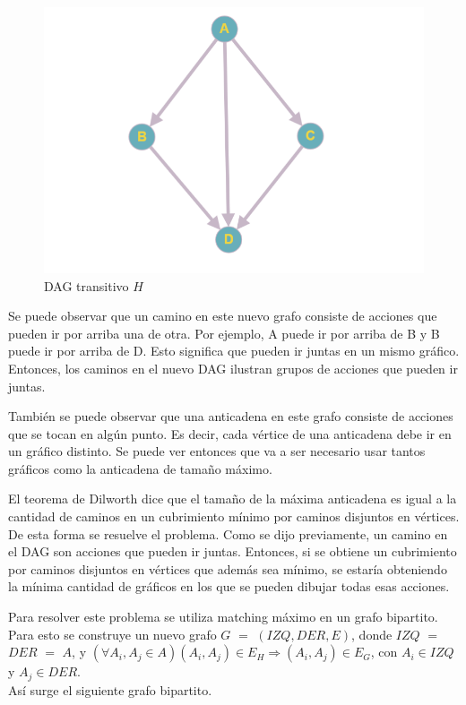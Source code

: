 \begin{figure}[H]
\centering
\includegraphics[width=15cm]{Imagenes/Ej2a.png}
\caption{DAG transitivo $H$}
\end{figure}

Se puede observar que un camino en este nuevo grafo consiste de acciones que pueden ir por arriba una de otra. Por ejemplo, A puede ir por arriba de B y B puede ir por arriba de D. Esto significa que pueden ir juntas en un mismo gráfico. Entonces, los caminos en el nuevo DAG ilustran grupos de acciones que pueden ir juntas.

También se puede observar que una anticadena en este grafo consiste de acciones que se tocan en algún punto. Es decir, cada vértice de una anticadena debe ir en un gráfico distinto. Se puede ver entonces que va a ser necesario usar tantos gráficos como la anticadena de tamaño máximo.

El teorema de Dilworth dice que el tamaño de la máxima anticadena es igual a la cantidad de caminos en un cubrimiento mínimo por caminos disjuntos en vértices. De esta forma se resuelve el problema. Como se dijo previamente, un camino en el DAG son acciones que pueden ir juntas. Entonces, si se obtiene un cubrimiento por caminos disjuntos en vértices que además sea mínimo, se estaría obteniendo la mínima cantidad de gráficos en los que se pueden dibujar todas esas acciones.

Para resolver este problema se utiliza matching máximo en un grafo bipartito. Para esto se construye un nuevo grafo $G$ $=$ $(IZQ,DER,E)$, donde $IZQ$ $=$ $DER$ $=$ $A$, y $(\forall A_{i}, A_{j} \in A) (A_{i}, A_{j}) \in E_{H} \Rightarrow (A_{i}, A_{j}) \in E_{G}$, con $A_{i} \in IZQ$ y $A_{j} \in DER$.\\
Así surge el siguiente grafo bipartito.

